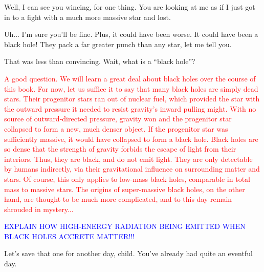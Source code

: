 \documentclass[main.tex]{subfiles}
\begin{document}
\par \Maia Well, I can see you wincing, for one thing.  You are looking at me as if I just got in to a fight with a much more massive star and lost.

\par \Pleione Uh... I'm sure you'll be fine. Plus, it could have been worse.  It could have been a black hole!  They pack a far greater punch than any star, let me tell you.

\par \Maia That was less than convincing.  Wait, what is a ``black hole''?

\begin{tcolorbox}[sharp corners, colback=red!30, colframe=red!80!blue, title=Black Holes]
\par \textcolor{red} {A good question.  We will learn a great deal about black holes over the course of this book.  For now, let us suffice it to say that many black holes are simply dead stars. Their progenitor stars ran out of nuclear fuel, which provided the star with the outward pressure it needed to resist gravity's inward pulling might.  With no source of outward-directed pressure, gravity won and the progenitor star collapsed to form a new, much denser object.  If the progenitor star was sufficiently massive, it would have collapsed to form a black hole.  %
Black holes are so dense that the strength of gravity forbids the escape of light from their interiors.  Thus, they are black, and do not emit light.  They are only detectable by humans indirectly, via their gravitational influence on surrounding matter and stars.  Of course, this only applies to low-mass black holes, comparable in total mass to massive stars.  The origins of super-massive black holes, on the other hand, are thought to be much more complicated, and to this day remain shrouded in mystery...}
\end{tcolorbox}

\begin{tcolorbox}[sharp corners, colback=blue!30, colframe=blue!80!blue, title=Light From Accreting Black Holes]
\par \textcolor{blue} {EXPLAIN HOW HIGH-ENERGY RADIATION BEING EMITTED WHEN BLACK HOLES ACCRETE MATTER!!!}
\end{tcolorbox}


\par \Pleione Let's save that one for another day, child.  You've already had quite an eventful day.
\end{document}
